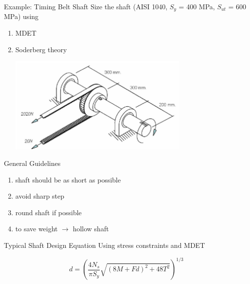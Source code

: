 \documentclass[10pt, svgnames]{beamer}
\begin{document}
\begin{frame}[label={sec:orgdda63bb}]{Example: Timing Belt Shaft}
Size the shaft (AISI 1040, \(S_y\) = 400 MPa, \(S_{ut}\) = 600 MPa) using

\begin{enumerate}
\item MDET
\item Soderberg theory

\centering
\includegraphics[width=0.7\textwidth]{pictures/shaft-sizing}
\end{enumerate}
\end{frame}

\begin{frame}[label={sec:org2de8864}]{General Guidelines}
\begin{enumerate}
\item shaft should be as short as possible
\item avoid sharp step
\item round shaft if possible
\item to save weight \(\rightarrow\) hollow shaft
\end{enumerate}
\end{frame}

\begin{frame}[label={sec:org5c5564f}]{Typical Shaft Design Equation}
Using stress constraints and MDET

$$ d = \left( \dfrac{4 N_s}{\pi S_y} \sqrt{(8M + Fd)^2 + 48T^2} \right)^{1/3} $$
\end{frame}
\end{document}
